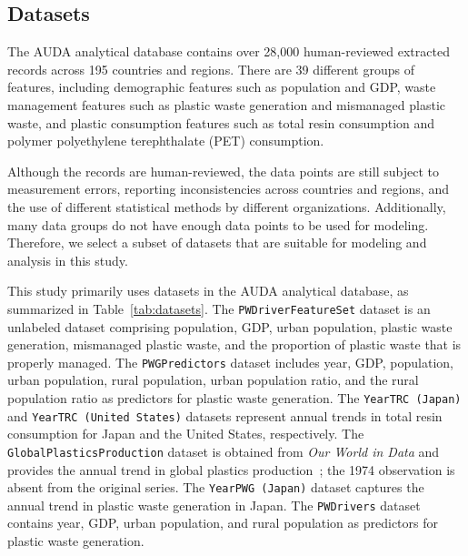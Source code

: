 \subsection{Datasets}

The AUDA analytical database contains over 28{,}000 human-reviewed extracted records across 195 countries and regions. There are 39 different groups of features, including demographic features such as population and GDP, waste management features such as plastic waste generation and mismanaged plastic waste, and plastic consumption features such as total resin consumption and polymer polyethylene terephthalate (PET) consumption.

Although the records are human-reviewed, the data points are still subject to measurement errors, reporting inconsistencies across countries and regions, and the use of different statistical methods by different organizations. Additionally, many data groups do not have enough data points to be used for modeling. Therefore, we select a subset of datasets that are suitable for modeling and analysis in this study.



This study primarily uses datasets in the AUDA analytical database, as summarized in Table~\ref{tab:datasets}. The \texttt{PWDriverFeatureSet} dataset is an unlabeled dataset comprising population, GDP, urban population, plastic waste generation, mismanaged plastic waste, and the proportion of plastic waste that is properly managed. The \texttt{PWGPredictors} dataset includes year, GDP, population, urban population, rural population, urban population ratio, and the rural population ratio as predictors for plastic waste generation. The \texttt{YearTRC (Japan)} and \texttt{YearTRC (United States)} datasets represent annual trends in total resin consumption for Japan and the United States, respectively. The \texttt{GlobalPlasticsProduction} dataset is obtained from \textit{Our World in Data} and provides the annual trend in global plastics production~\cite{owid_global_plastics_production}; the 1974 observation is absent from the original series. The \texttt{YearPWG (Japan)} dataset captures the annual trend in plastic waste generation in Japan. The \texttt{PWDrivers} dataset contains year, GDP, urban population, and rural population as predictors for plastic waste generation.
